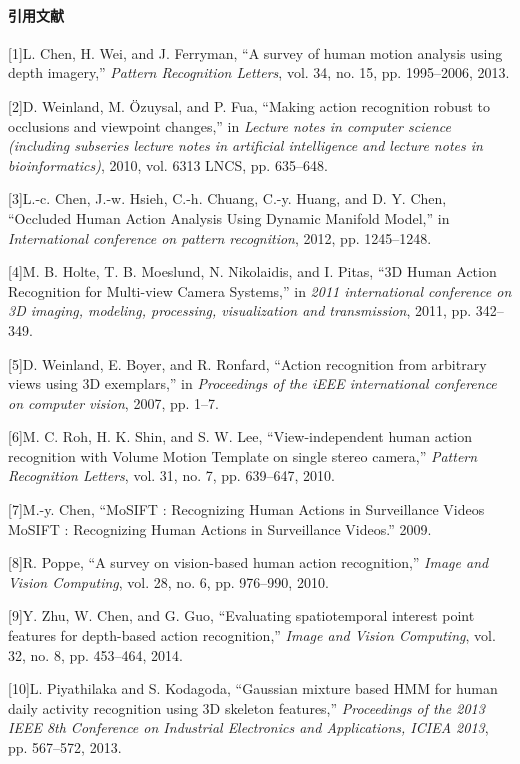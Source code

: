 \paragraph*{引用文献}\label{ux5f15ux7528ux6587ux732e}

{[}1{]}L. Chen, H. Wei, and J. Ferryman, ``A survey of human motion
analysis using depth imagery,'' \emph{Pattern Recognition Letters}, vol.
34, no. 15, pp. 1995--2006, 2013.

{[}2{]}D. Weinland, M. Özuysal, and P. Fua, ``Making action recognition
robust to occlusions and viewpoint changes,'' in \emph{Lecture notes in
computer science (including subseries lecture notes in artificial
intelligence and lecture notes in bioinformatics)}, 2010, vol. 6313
LNCS, pp. 635--648.

{[}3{]}L.-c. Chen, J.-w. Hsieh, C.-h. Chuang, C.-y. Huang, and D. Y.
Chen, ``Occluded Human Action Analysis Using Dynamic Manifold Model,''
in \emph{International conference on pattern recognition}, 2012, pp.
1245--1248.

{[}4{]}M. B. Holte, T. B. Moeslund, N. Nikolaidis, and I. Pitas, ``3D
Human Action Recognition for Multi-view Camera Systems,'' in \emph{2011
international conference on 3D imaging, modeling, processing,
visualization and transmission}, 2011, pp. 342--349.

{[}5{]}D. Weinland, E. Boyer, and R. Ronfard, ``Action recognition from
arbitrary views using 3D exemplars,'' in \emph{Proceedings of the iEEE
international conference on computer vision}, 2007, pp. 1--7.

{[}6{]}M. C. Roh, H. K. Shin, and S. W. Lee, ``View-independent human
action recognition with Volume Motion Template on single stereo
camera,'' \emph{Pattern Recognition Letters}, vol. 31, no. 7, pp.
639--647, 2010.

{[}7{]}M.-y. Chen, ``MoSIFT : Recognizing Human Actions in Surveillance
Videos MoSIFT : Recognizing Human Actions in Surveillance Videos.''
2009.

{[}8{]}R. Poppe, ``A survey on vision-based human action recognition,''
\emph{Image and Vision Computing}, vol. 28, no. 6, pp. 976--990, 2010.

{[}9{]}Y. Zhu, W. Chen, and G. Guo, ``Evaluating spatiotemporal interest
point features for depth-based action recognition,'' \emph{Image and
Vision Computing}, vol. 32, no. 8, pp. 453--464, 2014.

{[}10{]}L. Piyathilaka and S. Kodagoda, ``Gaussian mixture based HMM for
human daily activity recognition using 3D skeleton features,''
\emph{Proceedings of the 2013 IEEE 8th Conference on Industrial
Electronics and Applications, ICIEA 2013}, pp. 567--572, 2013.

